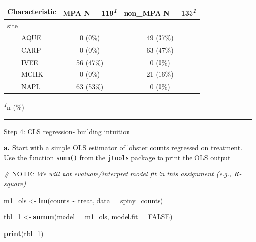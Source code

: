 \documentclass[
]{article}
\newenvironment{Shaded}{\begin{snugshade}}{\end{snugshade}}
\newcommand{\AlertTok}[1]{\textcolor[rgb]{0.94,0.16,0.16}{#1}}
\newcommand{\AttributeTok}[1]{\textcolor[rgb]{0.13,0.29,0.53}{#1}}
\newcommand{\CommentTok}[1]{\textcolor[rgb]{0.56,0.35,0.01}{\textit{#1}}}
\newcommand{\ConstantTok}[1]{\textcolor[rgb]{0.56,0.35,0.01}{#1}}
\newcommand{\FunctionTok}[1]{\textcolor[rgb]{0.13,0.29,0.53}{\textbf{#1}}}
\newcommand{\NormalTok}[1]{#1}
\newcommand{\OtherTok}[1]{\textcolor[rgb]{0.56,0.35,0.01}{#1}}
\newcommand{\SpecialCharTok}[1]{\textcolor[rgb]{0.81,0.36,0.00}{\textbf{#1}}}
\begin{document}
\begin{table}[!t]
\fontsize{12.0pt}{14.4pt}\selectfont
\begin{tabular*}{\linewidth}{@{\extracolsep{\fill}}lcc}
\toprule
\textbf{Characteristic} & \textbf{MPA}  N = 119\textsuperscript{\textit{1}} & \textbf{non\_MPA}  N = 133\textsuperscript{\textit{1}} \\ 
\midrule\addlinespace[2.5pt]
site &  &  \\ 
    AQUE & 0 (0\%) & 49 (37\%) \\ 
    CARP & 0 (0\%) & 63 (47\%) \\ 
    IVEE & 56 (47\%) & 0 (0\%) \\ 
    MOHK & 0 (0\%) & 21 (16\%) \\ 
    NAPL & 63 (53\%) & 0 (0\%) \\ 
\bottomrule
\end{tabular*}
\begin{minipage}{\linewidth}
\textsuperscript{\textit{1}}n (\%)\\
\end{minipage}
\end{table}

\begin{center}\rule{0.5\linewidth}{0.5pt}\end{center}

Step 4: OLS regression- building intuition

\textbf{a.} Start with a simple OLS estimator of lobster counts
regressed on treatment. Use the function \texttt{summ()} from the
\href{https://jtools.jacob-long.com/}{\texttt{jtools}} package to print
the OLS output

\begin{Shaded}
\begin{Highlighting}[]
\CommentTok{\# }\AlertTok{NOTE}\CommentTok{: We will not evaluate/interpret model fit in this assignment (e.g., R{-}square)}

\NormalTok{m1\_ols }\OtherTok{\textless{}{-}} \FunctionTok{lm}\NormalTok{(counts }\SpecialCharTok{\textasciitilde{}}\NormalTok{ treat,}
             \AttributeTok{data =}\NormalTok{ spiny\_counts) }

\NormalTok{tbl\_1 }\OtherTok{\textless{}{-}} \FunctionTok{summ}\NormalTok{(}\AttributeTok{model =}\NormalTok{ m1\_ols,}
     \AttributeTok{model.fit =} \ConstantTok{FALSE}\NormalTok{) }

\FunctionTok{print}\NormalTok{(tbl\_1)}
\end{Highlighting}
\end{Shaded}
\end{document}

